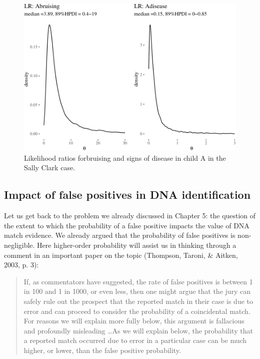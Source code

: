 \documentclass[
  10pt,
  dvipsnames,enabledeprecatedfontcommands]{scrartcl}
\begin{document}
\begin{figure}[H]


\begin{center}\includegraphics[width=0.9\linewidth]{chapter-outline_files/figure-latex/SClrs-1} \end{center}

\caption{Likelihood ratios forbruising and signs of disease in child A in the Sally Clark case.}
\label{fig:SClrs}

\end{figure}

\hypertarget{impact-of-false-positives-in-dna-identification}{%
\subsection{Impact of false positives in DNA
identification}\label{impact-of-false-positives-in-dna-identification}}

Let us get back to the problem we already discussed in Chapter 5: the
question of the extent to which the probability of a false positive
impacts the value of DNA match evidence. We already argued that the
probability of false positives is non-negligible. Here higher-order
probability will assist us in thinking through a comment in an important
paper on the topic (Thompson, Taroni, \& Aitken, 2003, p. 3):

\begin{quote}
If, as commentators have suggested, the rate of false positives is between 1 in 100 and 1 in 1000, or even less, then one might argue that the jury can safely rule out
the prospect that the reported match in their case is due to error and can proceed to consider the probability of a coincidental match. For reasons we will explain more fully below, this argument is fallacious and profoundly misleading \dots As we will explain below, the probability that a reported match occurred due to error in a particular case can be much higher, or lower, than the false positive probability. 
\end{quote}
\end{document}
